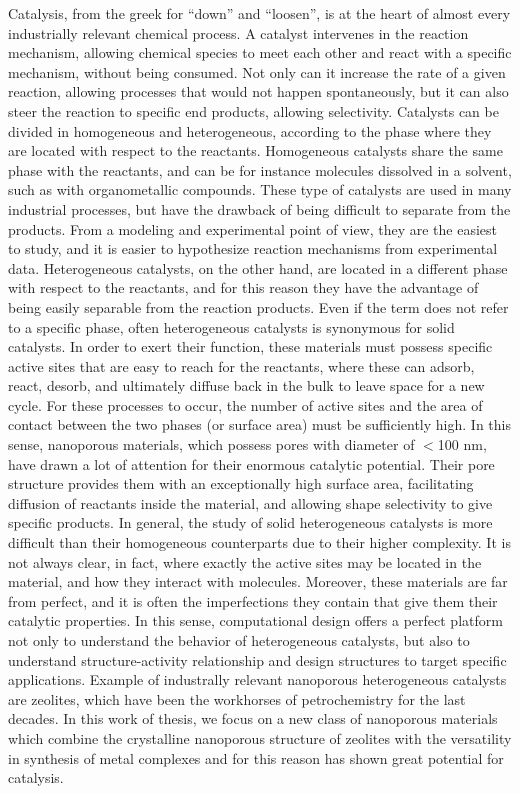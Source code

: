 Catalysis, from the greek for ``down'' and ``loosen'', is at the heart of almost every industrially relevant chemical process. A catalyst intervenes in the reaction mechanism, allowing chemical species to meet each other and react with a specific mechanism, without being consumed. Not only can it increase the rate of a given reaction, allowing processes that would not happen spontaneously, but it can also steer the reaction to specific end products, allowing selectivity. Catalysts can be divided in homogeneous and heterogeneous, according to the phase where they are located with respect to the reactants. Homogeneous catalysts share the same phase with the reactants, and can be for instance molecules dissolved in a solvent, such as with organometallic compounds. These type of catalysts are used in many industrial processes,  but have the drawback of being difficult to separate from the products. From a modeling and experimental point of view, they are the easiest to study, and it is easier to hypothesize reaction mechanisms from experimental data. Heterogeneous catalysts, on the other hand, are located in a different phase with respect to the reactants, and for this reason they have the advantage of being easily separable from the reaction products. Even if the term does not refer to a specific phase, often heterogeneous catalysts is synonymous for solid catalysts. In order to exert their function, these materials must possess specific active sites that are easy to reach for the reactants, where these can adsorb, react, desorb, and ultimately diffuse back in the bulk to leave space for a new cycle. For these processes to occur, the number of active sites and the area of contact between the two phases (or surface area) must be sufficiently high. 
\npar
In this sense, nanoporous materials, which possess pores with diameter of $<$100 nm\cite{mcnaught1997compendium}, have drawn a lot of attention for their enormous catalytic potential. Their pore structure provides them with an exceptionally high surface area, facilitating diffusion of reactants inside the material, and allowing shape selectivity to give specific products. In general, the study of solid heterogeneous catalysts is more difficult than their homogeneous counterparts due to their higher complexity. It is not always clear, in fact, where exactly the active sites may be located in the material, and how they interact with molecules. Moreover, these materials are far from perfect, and it is often the imperfections they contain that give them their catalytic properties. In this sense, computational design offers a perfect platform not only to understand the behavior of heterogeneous catalysts, but also to understand structure-activity relationship and design structures to target specific applications. Example of industrally relevant nanoporous heterogeneous catalysts are zeolites, which have been the workhorses of petrochemistry for the last decades. In this work of thesis, we focus on a new class of nanoporous materials which combine the crystalline nanoporous structure of zeolites with the versatility in synthesis of metal complexes and for this reason has shown great potential for catalysis.

